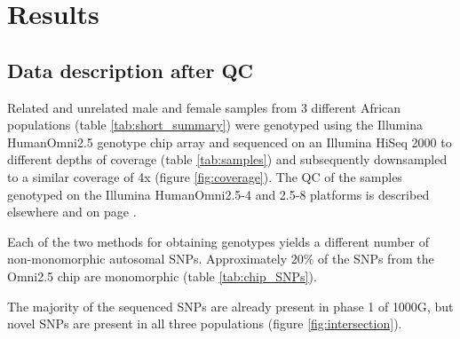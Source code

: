 \section{Results}


\subsection{Data description after QC}
\label{sec:agv_data_description}
Related and unrelated male and female samples from 3 different African populations (table \ref{tab:short_summary}) were genotyped using the Illumina HumanOmni2.5 genotype chip array and sequenced on an Illumina HiSeq 2000 to different depths of coverage (table \ref{tab:samples}) and subsequently downsampled to a similar coverage of 4x (figure \ref{fig:coverage}). The \gls{QC} of the samples genotyped on the Illumina HumanOmni2.5-4 and 2.5-8 platforms is described elsewhere\cite{Gurdasani2015} and on page \pageref{subsec:chipQC}.


Each of the two methods for obtaining genotypes yields a different number of non-monomorphic autosomal SNPs. Approximately 20\% of the SNPs from the Omni2.5 chip are monomorphic (table \ref{tab:chip_SNPs}).

The majority of the sequenced \glspl{SNP} are already present in phase 1 of \gls{1000G}\cite{1000G2012}, but novel SNPs are present in all three populations (figure \ref{fig:intersection}).





